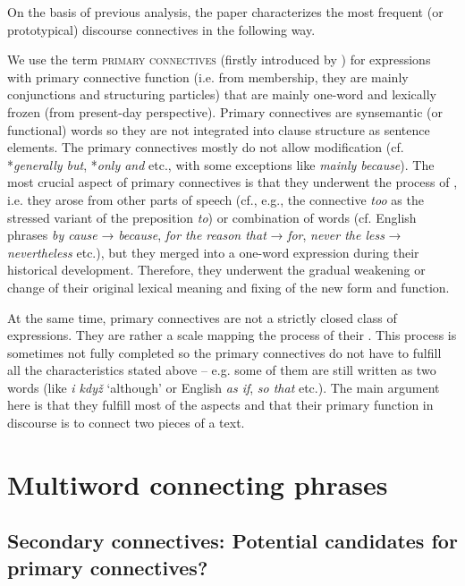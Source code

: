 \documentclass[output=paper]{langsci/langscibook.cls}
\begin{document}
On the basis of previous analysis, the paper characterizes the most frequent (or prototypical) discourse connectives in the following way. 

We use the term \textsc{primary connectives} (firstly introduced by \citealt{biblio:RyRyCentreand2014}) for expressions with primary connective function (i.e. from  membership, they are mainly conjunctions and structuring particles) that are mainly one-word and lexically frozen (from present-day perspective). Primary connectives are synsemantic (or functional) words so they are not integrated into clause structure as sentence elements. The primary connectives mostly do not allow modification (cf. *\textit{generally but}, *\textit{only and} etc., with some exceptions like \textit{mainly because}). The most crucial aspect of primary connectives is that they underwent the process of , i.e. they arose from other parts of speech (cf., e.g., the connective \textit{too} as the stressed variant of the preposition \textit{to}) or combination of words (cf. English phrases \textit{by cause} → \textit{because}, \textit{for the reason that} → \textit{for}, \textit{never the less} → \textit{nevertheless} etc.), but they merged into a one-word expression during their historical development. Therefore, they underwent the gradual weakening or change of their original lexical meaning and fixing of the new form and function.


At the same time, primary connectives are not a strictly closed class of expressions. They are rather a scale mapping the process of their . This process is sometimes not fully completed so the primary connectives do not have to fulfill all the characteristics stated above – e.g. some of them are still written as two words (like  \textit{i když} `although' or English \textit{as if}, \textit{so that} etc.). The main argument here is that they fulfill most of the aspects and that their primary function in discourse is to connect two pieces of a text.


\section{Multiword connecting phrases}

\subsection{Secondary connectives: Potential candidates for primary connectives?}
\end{document}
